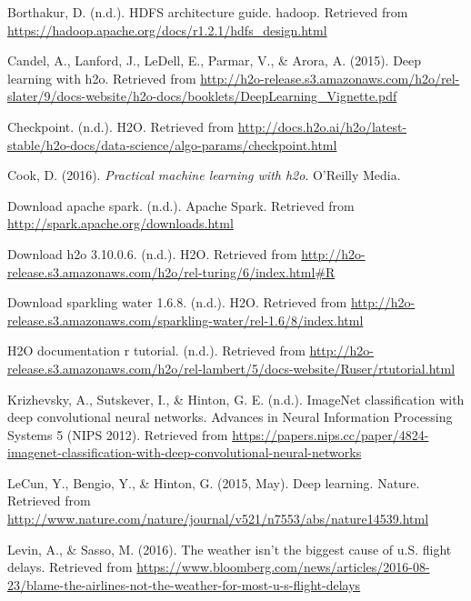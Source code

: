 \documentclass[12pt,twoside]{amherstthesis}
\begin{document}
  \hypertarget{ref-HDFS}{}
  Borthakur, D. (n.d.). HDFS architecture guide. hadoop. Retrieved from
  \url{https://hadoop.apache.org/docs/r1.2.1/hdfs_design.html}
  
  \hypertarget{ref-deepH2Odoc}{}
  Candel, A., Lanford, J., LeDell, E., Parmar, V., \& Arora, A. (2015).
  Deep learning with h2o. Retrieved from
  \url{http://h2o-release.s3.amazonaws.com/h2o/rel-slater/9/docs-website/h2o-docs/booklets/DeepLearning_Vignette.pdf}
  
  \hypertarget{ref-checkpoint}{}
  Checkpoint. (n.d.). H2O. Retrieved from
  \url{http://docs.h2o.ai/h2o/latest-stable/h2o-docs/data-science/algo-params/checkpoint.html}
  
  \hypertarget{ref-h2oBook}{}
  Cook, D. (2016). \emph{Practical machine learning with h2o}. O'Reilly
  Media.
  
  \hypertarget{ref-DownloadSpark}{}
  Download apache spark. (n.d.). Apache Spark. Retrieved from
  \url{http://spark.apache.org/downloads.html}
  
  \hypertarget{ref-H2OInstall}{}
  Download h2o 3.10.0.6. (n.d.). H2O. Retrieved from
  \url{http://h2o-release.s3.amazonaws.com/h2o/rel-turing/6/index.html\#R}
  
  \hypertarget{ref-DownloadSparklingWater}{}
  Download sparkling water 1.6.8. (n.d.). H2O. Retrieved from
  \url{http://h2o-release.s3.amazonaws.com/sparkling-water/rel-1.6/8/index.html}
  
  \hypertarget{ref-h2odocu}{}
  H2O documentation r tutorial. (n.d.). Retrieved from
  \url{http://h2o-release.s3.amazonaws.com/h2o/rel-lambert/5/docs-website/Ruser/rtutorial.html}
  
  \hypertarget{ref-Imagenet}{}
  Krizhevsky, A., Sutskever, I., \& Hinton, G. E. (n.d.). ImageNet
  classification with deep convolutional neural networks. Advances in
  Neural Information Processing Systems 5 (NIPS 2012). Retrieved from
  \url{https://papers.nips.cc/paper/4824-imagenet-classification-with-deep-convolutional-neural-networks}
  
  \hypertarget{ref-DeepLearn11}{}
  LeCun, Y., Bengio, Y., \& Hinton, G. (2015, May). Deep learning. Nature.
  Retrieved from
  \url{http://www.nature.com/nature/journal/v521/n7553/abs/nature14539.html}
  
  \hypertarget{ref-weatherDelayNews}{}
  Levin, A., \& Sasso, M. (2016). The weather isn't the biggest cause of
  u.S. flight delays. Retrieved from
  \url{https://www.bloomberg.com/news/articles/2016-08-23/blame-the-airlines-not-the-weather-for-most-u-s-flight-delays}
  
\end{document}
